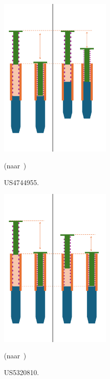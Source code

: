 \begin{minipage}[t]{0.49\textwidth} 
    \vspace{0pt} 
    \begin{figure}[H] 
        \centering 
        \includegraphics[width=0.49\textwidth]{figures/Werking US4744955.png} 
        \caption{US4744955.}\label{fig:werking US4744955}
        (naar\ \cite{RN16})
    \end{figure} 
\end{minipage} 
\begin{minipage}[t]{0.49\textwidth} 
    \vspace{0pt} 
    \begin{figure}[H] 
        \centering 
        \includegraphics[width=0.49\textwidth]{figures/Werking US5320810.png} 
        \caption{US5320810.}\label{fig:werking US5320810} 
        (naar\ \cite{RN17})
    \end{figure} 
\end{minipage}

